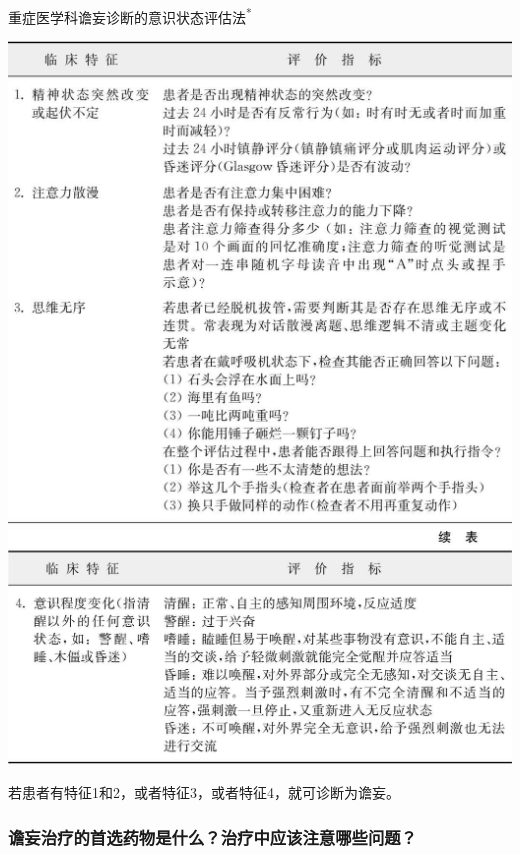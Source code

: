 \begin{table}[htbp]
{\begin{center}
\caption{重症医学科谵妄诊断的意识状态评估法\textsuperscript{*}}
\label{tab21-7}
\includegraphics[width=.9\textwidth,height=\textheight,keepaspectratio]{./images/Image00247.jpg}
\includegraphics[width=.9\textwidth,height=\textheight,keepaspectratio]{./images/Image00248.jpg}
\end{center}
}

\footnotesize * 若患者有特征1和2，或者特征3，或者特征4，就可诊断为谵妄。
\end{table}





\subsubsection{谵妄治疗的首选药物是什么？治疗中应该注意哪些问题？}

